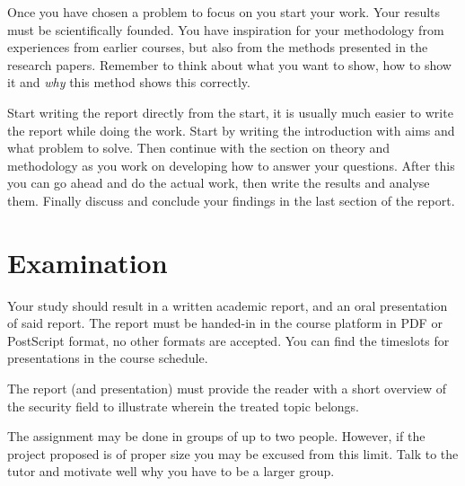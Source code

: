 \documentclass[a4paper]{llncs}
\begin{document}
Once you have chosen a problem to focus on you start your work.
Your results must be scientifically founded.
You have inspiration for your methodology from experiences from earlier 
courses, but also from the methods presented in the research papers.
Remember to think about what you want to show, how to show it and \emph{why} 
this method shows this correctly.

Start writing the report directly from the start, it is usually much easier to 
write the report while doing the work.
Start by writing the introduction with aims and what problem to solve.
Then continue with the section on theory and methodology as you work on 
developing how to answer your questions.
After this you can go ahead and do the actual work, then write the results and 
analyse them.
Finally discuss and conclude your findings in the last section of the report.


\section{Examination}%
\label{sec:exam}

Your study should result in a written academic report, and an oral presentation 
of said report.
The report must be handed-in in the course platform in PDF or PostScript 
format, no other formats are accepted.
You can find the timeslots for presentations in the course schedule.

The report (and presentation) must provide the reader with a short overview of 
the security field to illustrate wherein the treated topic belongs.

The assignment may be done in groups of up to two people.
However, if the project proposed is of proper size you may be excused from this 
limit.
Talk to the tutor and motivate well why you have to be a larger group.


\printbibliography{}
\end{document}
